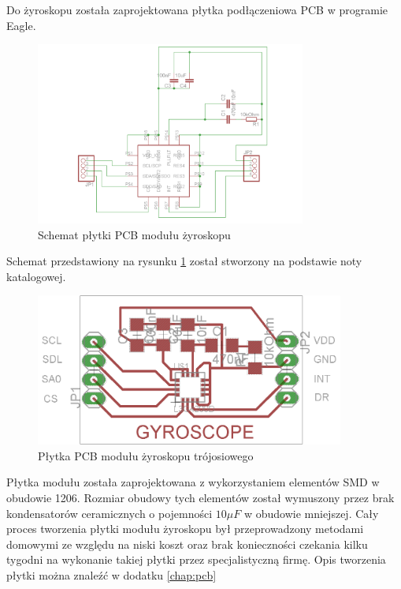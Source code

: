 Do żyroskopu została zaprojektowana płytka podłączeniowa PCB w programie Eagle.
\begin{figure}[!ht]
 \centering
 \includegraphics[height=60mm]{../images/ch04/L3G4200Dschematic.png}
 \caption{Schemat płytki PCB modułu żyroskopu}
 \label{fig:L3G4200DSchem}
\end{figure}

Schemat przedstawiony na rysunku \ref{fig:L3G4200DSchem} został stworzony na podstawie noty katalogowej.

\begin{figure}[!ht]
 \centering
 \includegraphics[height=50mm]{../images/ch04/L3G4200Dpcb.png}
 \caption{Płytka PCB modułu żyroskopu trójosiowego}
 \label{fig:L3G4200DPCB}
\end{figure}

Płytka modułu została zaprojektowana z wykorzystaniem elementów SMD w obudowie 1206. Rozmiar obudowy tych elementów został wymuszony przez brak kondensatorów ceramicznych o pojemności $10\mu F$ w obudowie mniejszej. Cały proces tworzenia płytki modułu żyroskopu był przeprowadzony metodami domowymi ze względu na niski koszt oraz brak konieczności czekania kilku tygodni na wykonanie takiej płytki przez specjalistyczną firmę. Opis tworzenia płytki można znaleźć w dodatku \ref{chap:pcb}

